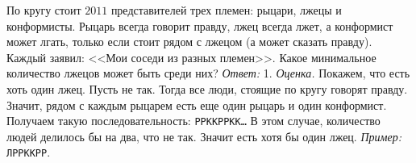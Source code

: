 \problem
По кругу стоит $2011$ представителей трех племен: рыцари, лжецы и конформисты.
Рыцарь всегда говорит правду, лжец всегда лжет, а конформист может лгать,
только если стоит рядом с лжецом (а может сказать правду).
Каждый заявил: <<Мои соседи из разных племен>>.
Какое минимальное количество лжецов может быть среди них?
\solution
\emph{Ответ:} 1.
\emph{Оценка.}
Покажем, что есть хоть один лжец.
Пусть не так.
Тогда все люди, стоящие по кругу говорят правду.
Значит, рядом с каждым рыцарем есть еще один рыцарь и один конформист.
Получаем такую последовательность: \texttt{РРККРРКК\ldots}
В этом случае, количество людей делилось бы на два, что не так.
Значит есть хотя бы один лжец.
\emph{Пример:} \texttt{ЛРРККРР}.
\endproblem
